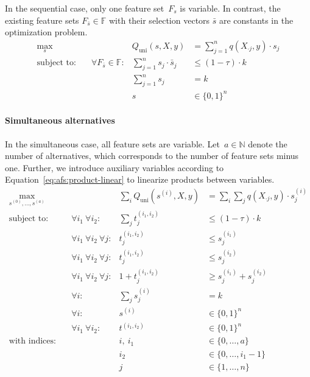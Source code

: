 \documentclass{article}
\theoremstyle{definition}
\begin{document}
In the sequential case, only one feature set~$F_s$ is variable.
In contrast, the existing feature sets $F_{\bar{s}} \in \mathbb{F}$ with their selection vectors $\bar{s}$ are constants in the optimization problem.
%
\begin{equation}
	\begin{aligned}
		\max_s &\quad & Q_{\text{uni}}(s,X,y) &= \sum_{j=1}^{n} q(X_{\cdot{}j},y) \cdot s_j \\
		\text{subject to:} &\quad \forall F_{\bar{s}} \in \mathbb{F} :& \sum_{j=1}^n s_j \cdot \bar{s}_j &\leq (1 - \tau) \cdot k \\
		&\quad & \sum_{j=1}^n s_j &= k \\
		&\quad & s &\in \{0,1\}^n
	\end{aligned}
	\label{eq:afs:afs-sequential-complete}
\end{equation}
%
\paragraph{Simultaneous alternatives}

In the simultaneous case, all feature sets are variable.
Let~$a \in \mathbb{N}$ denote the number of alternatives, which corresponds to the number of feature sets minus one.
Further, we introduce auxiliary variables according to Equation~\ref{eq:afs:product-linear} to linearize products between variables.
%
\begin{equation}
	\begin{aligned}
		\max_{s^{(0)}, \dots, s^{(a)}} &\quad & \sum_i Q_{\text{uni}}(s^{(i)},X,y) &= \sum_i \sum_j q(X_{\cdot{}j},y) \cdot s^{(i)}_j\\
		\text{subject to:} &\quad \forall i_1~\forall i_2 :& \sum_j t^{(i_1,i_2)}_j &\leq (1 - \tau) \cdot k \\
		&\quad \forall i_1~\forall i_2~\forall j :& t^{(i_1,i_2)}_j &\leq s^{(i_1)}_j \\
		&\quad \forall i_1~\forall i_2~\forall j :& t^{(i_1,i_2)}_j &\leq s^{(i_2)}_j \\
		&\quad \forall i_1~\forall i_2~\forall j :& 1 + t^{(i_1,i_2)}_j &\geq s^{(i_1)}_j + s^{(i_2)}_j \\
		&\quad \forall i :& \sum_j s^{(i)}_j &= k \\
		&\quad \forall i :& s^{(i)} &\in \{0,1\}^n \\
		&\quad \forall i_1~\forall i_2 :& t^{(i_1,i_2)} &\in \{0,1\}^n \\
		\text{with indices:} &\quad & i,~i_1 &\in \{0, \dots, a\} \\
		&\quad & i_2 &\in \{0, \dots, i_1-1\} \\
		&\quad & j &\in \{1, \dots, n\}
	\end{aligned}
	\label{eq:afs:afs-simultaneous-complete}
\end{equation}
\end{document}

